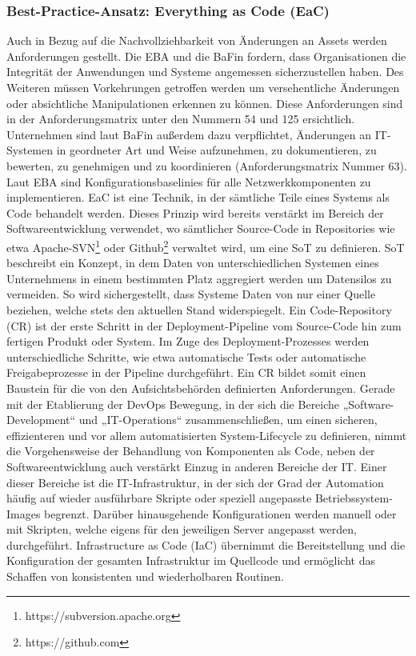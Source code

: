 \subsubsection{Best-Practice-Ansatz: Everything as Code (EaC)}
Auch in Bezug auf die Nachvollziehbarkeit von Änderungen an Assets werden Anforderungen gestellt. Die EBA und die BaFin fordern, dass Organisationen die Integrität der Anwendungen und Systeme angemessen sicherzustellen haben. Des Weiteren müssen Vorkehrungen getroffen werden um versehentliche Änderungen oder absichtliche Manipulationen erkennen zu können. Diese Anforderungen sind in der Anforderungsmatrix unter den Nummern 54 und 125 ersichtlich. Unternehmen sind laut BaFin außerdem dazu verpflichtet, Änderungen an IT-Systemen in geordneter Art und Weise aufzunehmen, zu dokumentieren, zu bewerten, zu genehmigen und zu koordinieren (Anforderungsmatrix Nummer 63). Laut EBA sind Konfigurationsbaselinies für alle Netzwerkkomponenten zu implementieren.
\bigbreak
EaC ist eine Technik, in der sämtliche Teile eines Systems als Code behandelt werden. Dieses Prinzip wird bereits verstärkt im Bereich der Softwareentwicklung verwendet, wo sämtlicher Source-Code in Repositories wie etwa Apache-SVN\footnote{https://subversion.apache.org} oder Github\footnote{https://github.com} verwaltet wird, um eine SoT zu definieren. SoT beschreibt ein Konzept, in dem Daten von unterschiedlichen Systemen eines Unternehmens in einem bestimmten Platz aggregiert werden um Datensilos zu vermeiden. So wird sichergestellt, dass Systeme Daten von nur einer Quelle beziehen, welche stets den aktuellen Stand widerspiegelt. Ein \glqq{}Code-Repository\grqq{} (CR) ist der erste Schritt in der Deployment-Pipeline vom Source-Code hin zum fertigen Produkt oder System. Im Zuge des Deployment-Prozesses werden unterschiedliche Schritte, wie etwa automatische Tests oder automatische Freigabeprozesse in der Pipeline durchgeführt. Ein CR bildet somit einen Baustein für die von den Aufsichtsbehörden definierten Anforderungen. \autocite{mulesoft}
\bigbreak
Gerade mit der Etablierung der DevOps Bewegung, in der sich die Bereiche „Software-Development“ und „IT-Operations“ zusammenschließen, um einen sicheren, effizienteren und vor allem automatisierten System-Lifecycle zu definieren, nimmt die Vorgehensweise der Behandlung von Komponenten als Code, neben der Softwareentwicklung auch verstärkt Einzug in anderen Bereiche der IT. \autocite{könig_kugel_2019}
\bigbreak
Einer dieser Bereiche ist die IT-Infrastruktur, in der sich der Grad der Automation häufig auf wieder ausführbare Skripte oder speziell angepasste Betriebssystem-Images begrenzt. Darüber hinausgehende Konfigurationen werden manuell oder mit Skripten, welche eigens für den jeweiligen Server angepasst werden, durchgeführt. \glqq{}Infrastructure as Code\grqq{} (IaC) übernimmt die Bereitstellung und die Konfiguration der gesamten Infrastruktur im Quellcode und ermöglicht das Schaffen von konsistenten und wiederholbaren Routinen. \autocite{özel_pautz_schmidt_2020}
